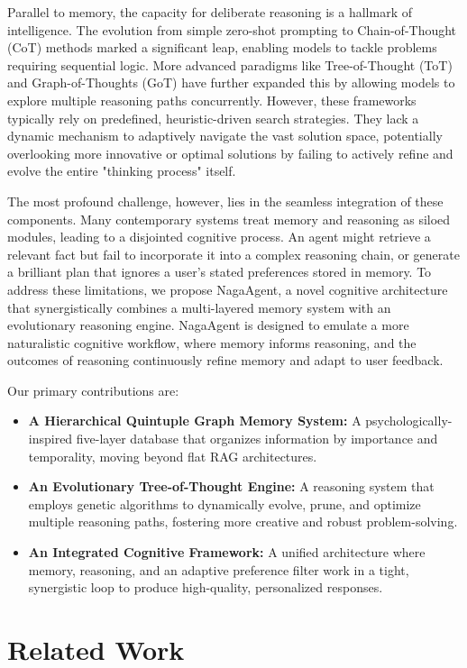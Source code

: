 \documentclass[letterpaper]{article} %
\begin{document}
Parallel to memory, the capacity for deliberate reasoning is a hallmark of intelligence. The evolution from simple zero-shot prompting to Chain-of-Thought (CoT) methods marked a significant leap, enabling models to tackle problems requiring sequential logic. More advanced paradigms like Tree-of-Thought (ToT) \cite{yao2024tree, long2023large} and Graph-of-Thoughts (GoT) \cite{besta2024graph} have further expanded this by allowing models to explore multiple reasoning paths concurrently. However, these frameworks typically rely on predefined, heuristic-driven search strategies. They lack a dynamic mechanism to adaptively navigate the vast solution space, potentially overlooking more innovative or optimal solutions by failing to actively refine and evolve the entire "thinking process" itself.

The most profound challenge, however, lies in the seamless integration of these components. Many contemporary systems treat memory and reasoning as siloed modules, leading to a disjointed cognitive process. An agent might retrieve a relevant fact but fail to incorporate it into a complex reasoning chain, or generate a brilliant plan that ignores a user's stated preferences stored in memory. To address these limitations, we propose NagaAgent, a novel cognitive architecture that synergistically combines a multi-layered memory system with an evolutionary reasoning engine. NagaAgent is designed to emulate a more naturalistic cognitive workflow, where memory informs reasoning, and the outcomes of reasoning continuously refine memory and adapt to user feedback.

Our primary contributions are:
\begin{itemize}
\item \textbf{A Hierarchical Quintuple Graph Memory System:} A psychologically-inspired five-layer database that organizes information by importance and temporality, moving beyond flat RAG architectures.
\item \textbf{An Evolutionary Tree-of-Thought Engine:} A reasoning system that employs genetic algorithms to dynamically evolve, prune, and optimize multiple reasoning paths, fostering more creative and robust problem-solving.
\item \textbf{An Integrated Cognitive Framework:} A unified architecture where memory, reasoning, and an adaptive preference filter work in a tight, synergistic loop to produce high-quality, personalized responses.
\end{itemize}

\section{Related Work}
\end{document}
